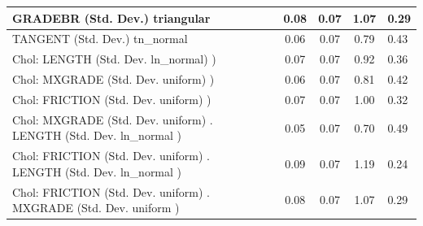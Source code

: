 \begin{table}
\begin{center}
\begin{tabular}{|l|l|c|c|c|l|}
			\hline
			GRADEBR (Std. Dev.) triangular &  & 0.08 & 0.07 & 1.07 & 0.29 \\
			\hline
			TANGENT (Std. Dev.) tn_normal &  & 0.06 & 0.07 & 0.79 & 0.43 \\
			\hline
			 Chol: LENGTH (Std. Dev. ln_normal) ) &  & 0.07 & 0.07 & 0.92 & 0.36 \\
			\hline
			 Chol: MXGRADE (Std. Dev. uniform) ) &  & 0.06 & 0.07 & 0.81 & 0.42 \\
			\hline
			 Chol: FRICTION (Std. Dev. uniform) ) &  & 0.07 & 0.07 & 1.00 & 0.32 \\
			\hline
			 Chol: MXGRADE (Std. Dev. uniform) . LENGTH (Std. Dev.   ln_normal ) &  & 0.05 & 0.07 & 0.70 & 0.49 \\
			\hline
			 Chol: FRICTION (Std. Dev. uniform) . LENGTH (Std. Dev.   ln_normal ) &  & 0.09 & 0.07 & 1.19 & 0.24 \\
			\hline
			 Chol: FRICTION (Std. Dev. uniform) . MXGRADE (Std. Dev.   uniform ) &  & 0.08 & 0.07 & 1.07 & 0.29 \\
			\hline
		\end{tabular}
	\end{center}
\end{table}